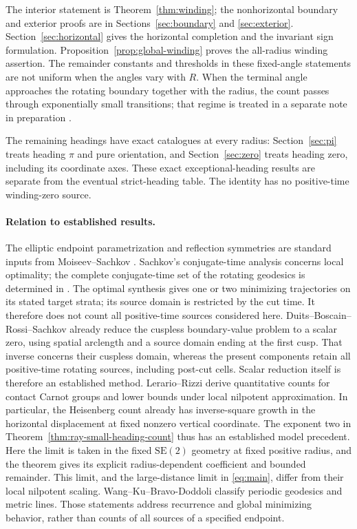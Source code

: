 \documentclass[11pt,a4paper]{article}
\theoremstyle{remark}\newtheorem{remark}[theorem]{Remark}
\begin{document}
The interior statement is Theorem~\ref{thm:winding}; the nonhorizontal
boundary and exterior proofs are in Sections~\ref{sec:boundary}
and \ref{sec:exterior}. Section~\ref{sec:horizontal} gives the horizontal
completion and the invariant sign formulation.
Proposition~\ref{prop:global-winding} proves the all-radius winding
assertion. The remainder constants and thresholds in these fixed-angle
statements are not uniform when the angles vary with $R$.
When the terminal angle approaches the rotating boundary together with
the radius, the count passes through exponentially small transitions;
that regime is treated in a separate note in preparation \cite{TF}.

The remaining headings have exact catalogues at every radius:
Section~\ref{sec:pi} treats heading $\pi$ and pure orientation,
and Section~\ref{sec:zero} treats heading zero, including its coordinate
axes. These exact exceptional-heading results are separate from the
eventual strict-heading table. The identity has no positive-time
winding-zero source.

\paragraph{Relation to established results.}
The elliptic endpoint parametrization and reflection symmetries are
standard inputs from Moiseev--Sachkov \cite[Sections 3--5]{MS}.
Sachkov's conjugate-time analysis \cite[Section 2]{SC} concerns local
optimality; the complete conjugate-time set of the rotating geodesics is
determined in \cite{CT}. The optimal synthesis \cite[Theorems 3.1--3.2]{SS} gives one
or two minimizing trajectories on its stated target strata; its source
domain is restricted by the cut time. It therefore does not count all
positive-time sources considered here.
Duits--Boscain--Rossi--Sachkov \cite[Theorems 5--6 and 11]{DBRS}
already reduce the cuspless boundary-value problem to a scalar zero,
using spatial arclength and a source domain ending at the first cusp.
That inverse concerns their cuspless domain, whereas the present
components retain all positive-time rotating sources, including post-cut
cells. Scalar reduction itself is therefore an established method.
Lerario--Rizzi \cite[Example 2, equation (2), and Theorems 2, 7--9]{LR}
derive quantitative counts for contact Carnot groups and lower bounds
under local nilpotent approximation. In particular, the Heisenberg count
already has inverse-square growth in the horizontal displacement at fixed
nonzero vertical coordinate. The exponent two in
Theorem~\ref{thm:ray-small-heading-count} thus has an established model
precedent. Here the limit is taken in the fixed $\mathrm{SE}(2)$ geometry at fixed
positive radius, and the theorem gives its explicit radius-dependent
coefficient and bounded remainder. This limit, and the large-distance
limit in \eqref{eq:main}, differ from their local nilpotent scaling.
Wang--Ku--Bravo-Doddoli \cite[Theorems A--B]{WKB} classify periodic
geodesics and metric lines. Those statements address recurrence and
global minimizing behavior, rather than counts of all sources of a
specified endpoint.
\end{document}
